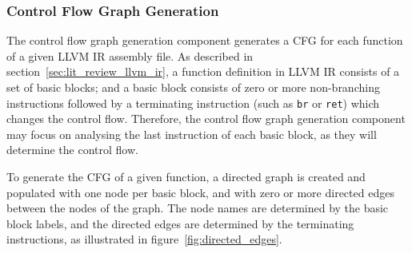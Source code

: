 
\subsubsection{Control Flow Graph Generation}
\label{sec:design_control_flow_graph_generation}

The control flow graph generation component generates a CFG for each function of a given LLVM IR assembly file. As described in section~\ref{sec:lit_review_llvm_ir}, a function definition in LLVM IR consists of a set of basic blocks; and a basic block consists of zero or more non-branching instructions followed by a terminating instruction (such as \texttt{br} or \texttt{ret}) which changes the control flow. Therefore, the control flow graph generation component may focus on analysing the last instruction of each basic block, as they will determine the control flow.

To generate the CFG of a given function, a directed graph is created and populated with one node per basic block, and with zero or more directed edges between the nodes of the graph. The node names are determined by the basic block labels, and the directed edges are determined by the terminating instructions, as illustrated in figure~\ref{fig:directed_edges}.

